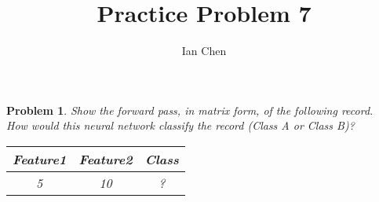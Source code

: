 \documentclass[11pt]{article}
\author{Ian Chen}
\title{Practice Problem 7}
\theoremstyle{description}
\newtheorem{problem}{Problem}
\theoremstyle{break}
\begin{document}
    \maketitle

    \begin{problem}
        Show the forward pass, in matrix form, of the following record.\\
        How would this neural network classify the record (Class A or Class B)?\\
        \begin{tabular}{|c|c|c|}
            \hline
            Feature1 & Feature2 & Class \\
            \hline
            5        & 10       & ?     \\
            \hline
        \end{tabular}
    \end{problem}
\end{document}
